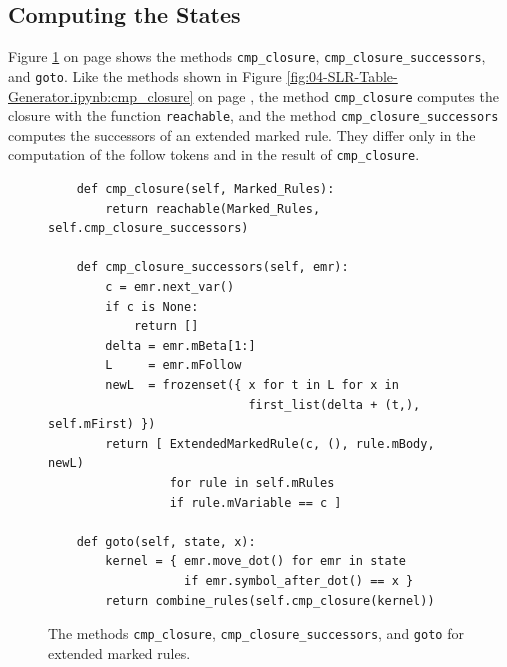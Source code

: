\subsection{Computing the States}
Figure \ref{fig:05-LR-Table-Generator.ipynb:cmp_closure} on page \pageref{fig:05-LR-Table-Generator.ipynb:cmp_closure}
shows the methods \texttt{cmp\_closure}, \texttt{cmp\_closure\_successors}, and \texttt{goto}.  Like the methods
shown in Figure \ref{fig:04-SLR-Table-Generator.ipynb:cmp_closure} on page
\pageref{fig:04-SLR-Table-Generator.ipynb:cmp_closure}, the method \texttt{cmp\_closure} computes the closure with the
function \texttt{reachable}, and the method \texttt{cmp\_closure\_successors} computes the successors of an extended
marked rule.  They differ only in the computation of the follow tokens and in the result of \texttt{cmp\_closure}.

\begin{figure}[!ht]
\centering
\begin{verbatim}
    def cmp_closure(self, Marked_Rules):
        return reachable(Marked_Rules, self.cmp_closure_successors)

    def cmp_closure_successors(self, emr):
        c = emr.next_var()
        if c is None:
            return []
        delta = emr.mBeta[1:]
        L     = emr.mFollow
        newL  = frozenset({ x for t in L for x in
                            first_list(delta + (t,), self.mFirst) })
        return [ ExtendedMarkedRule(c, (), rule.mBody, newL)
                 for rule in self.mRules
                 if rule.mVariable == c ]

    def goto(self, state, x):
        kernel = { emr.move_dot() for emr in state
                   if emr.symbol_after_dot() == x }
        return combine_rules(self.cmp_closure(kernel))
\end{verbatim}
\vspace*{-0.3cm}
\caption{The methods \texttt{cmp\_closure}, \texttt{cmp\_closure\_successors}, and \texttt{goto} for extended marked
         rules.}
\label{fig:05-LR-Table-Generator.ipynb:cmp_closure}
\end{figure}

